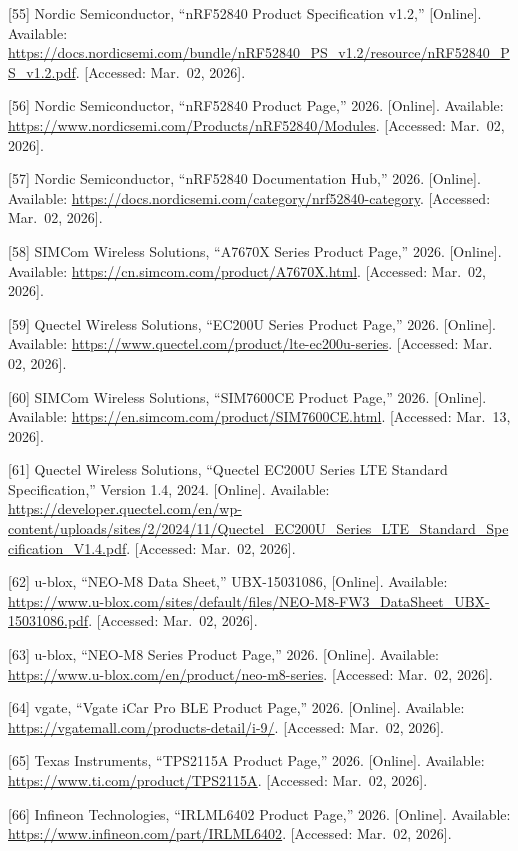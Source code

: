 \documentclass[a4paper]{extarticle}
\begin{document}
{[}55{]} Nordic Semiconductor, ``nRF52840 Product Specification v1.2,''
{[}Online{]}. Available:
\url{https://docs.nordicsemi.com/bundle/nRF52840_PS_v1.2/resource/nRF52840_PS_v1.2.pdf}.
{[}Accessed: Mar.~02, 2026{]}.

{[}56{]} Nordic Semiconductor, ``nRF52840 Product Page,'' 2026. {[}Online{]}.
Available: \url{https://www.nordicsemi.com/Products/nRF52840/Modules}.
{[}Accessed: Mar.~02, 2026{]}.

{[}57{]} Nordic Semiconductor, ``nRF52840 Documentation Hub,'' 2026.
{[}Online{]}. Available:
\url{https://docs.nordicsemi.com/category/nrf52840-category}. {[}Accessed:
Mar.~02, 2026{]}.

{[}58{]} SIMCom Wireless Solutions, ``A7670X Series Product Page,'' 2026.
{[}Online{]}. Available: \url{https://cn.simcom.com/product/A7670X.html}.
{[}Accessed: Mar.~02, 2026{]}.

{[}59{]} Quectel Wireless Solutions, ``EC200U Series Product Page,'' 2026.
{[}Online{]}. Available:
\url{https://www.quectel.com/product/lte-ec200u-series}. {[}Accessed: Mar.
02, 2026{]}.

{[}60{]} SIMCom Wireless Solutions, ``SIM7600CE Product Page,'' 2026.
{[}Online{]}. Available: \url{https://en.simcom.com/product/SIM7600CE.html}.
{[}Accessed: Mar.~13, 2026{]}.

{[}61{]} Quectel Wireless Solutions, ``Quectel EC200U Series LTE Standard
Specification,'' Version 1.4, 2024. {[}Online{]}. Available:
\url{https://developer.quectel.com/en/wp-content/uploads/sites/2/2024/11/Quectel_EC200U_Series_LTE_Standard_Specification_V1.4.pdf}.
{[}Accessed: Mar.~02, 2026{]}.

{[}62{]} u-blox, ``NEO-M8 Data Sheet,'' UBX-15031086, {[}Online{]}. Available:
\url{https://www.u-blox.com/sites/default/files/NEO-M8-FW3_DataSheet_UBX-15031086.pdf}.
{[}Accessed: Mar.~02, 2026{]}.

{[}63{]} u-blox, ``NEO-M8 Series Product Page,'' 2026. {[}Online{]}.
Available: \url{https://www.u-blox.com/en/product/neo-m8-series}.
{[}Accessed: Mar.~02, 2026{]}.

{[}64{]} vgate, ``Vgate iCar Pro BLE Product Page,'' 2026. {[}Online{]}.
Available: \url{https://vgatemall.com/products-detail/i-9/}. {[}Accessed:
Mar.~02, 2026{]}.

{[}65{]} Texas Instruments, ``TPS2115A Product Page,'' 2026. {[}Online{]}.
Available: \url{https://www.ti.com/product/TPS2115A}. {[}Accessed: Mar.~02,
2026{]}.

{[}66{]} Infineon Technologies, ``IRLML6402 Product Page,'' 2026.
{[}Online{]}. Available: \url{https://www.infineon.com/part/IRLML6402}.
{[}Accessed: Mar.~02, 2026{]}.
\end{document}
